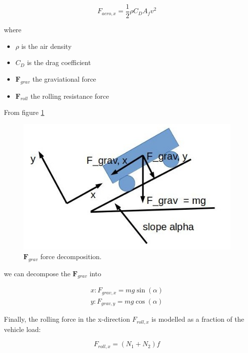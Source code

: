 \begin{equation}
F_{aero,x} = \frac{1}{2}\rho C_D A_f v^2 
\label{chassis_model_drag_term}
\end{equation}

where

\begin{itemize}
\item $\rho$ is the air density
\item $C_D$ is the drag coefficient
\item $\mathbf{F}_{grav}$ the graviational force
\item $\mathbf{F}_{roll}$ the rolling resistance force
\end{itemize}

From figure \ref{gravity_decomp_diagram}


\begin{figure}[!htb]
\begin{center}
\includegraphics[scale=0.280]{img/model_automotive_sys/gravity_decomp_diagram.jpg}
\end{center}
\caption{$\mathbf{F}_{grav}$ force decomposition.}
\label{gravity_decomp_diagram}
\end{figure}


we can decompose the $\mathbf{F}_{grav}$ into 

\begin{eqnarray}
x: F_{grav, x} = mg\sin(\alpha)  \\
y: F_{grav, y} = mg\cos(\alpha) 
\label{gravity_decomp}
\end{eqnarray}

Finally, the rolling force in the x-direction $F_{roll, x}$ is modelled as a fraction of the vehicle load:

\begin{equation}
F_{roll,x} = (N_1 + N_2)f
\label{chassis_model_roll_force}
\end{equation}


